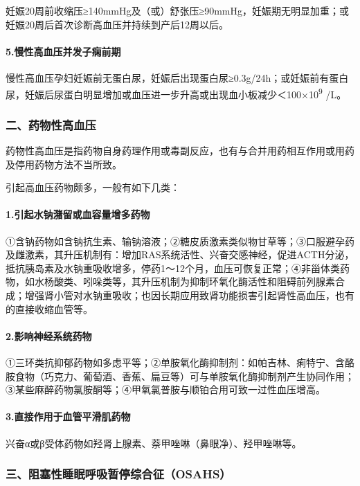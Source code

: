 妊娠20周前收缩压≥140mmHg及（或）舒张压≥90mmHg，妊娠期无明显加重；或妊娠20周后首次诊断高血压并持续到产后12周以后。

\paragraph{5.慢性高血压并发子痫前期}

慢性高血压孕妇妊娠前无蛋白尿，妊娠后出现蛋白尿≥0.3g/24h；或妊娠前有蛋白尿，妊娠后尿蛋白明显增加或血压进一步升高或出现血小板减少＜100×10\textsuperscript{9}
/L。

\subsubsection{二、药物性高血压}

药物性高血压是指药物自身药理作用或毒副反应，也有与合并用药相互作用或用药及停用药物方法不当所致。

引起高血压药物颇多，一般有如下几类：

\paragraph{1.引起水钠潴留或血容量增多药物}

①含钠药物如含钠抗生素、输钠溶液；②糖皮质激素类似物甘草等；③口服避孕药及雌激素，其升压机制有：增加RAS系统活性、兴奋交感神经，促进ACTH分泌，抵抗胰岛素及水钠重吸收增多，停药1～12个月，血压可恢复正常；④非甾体类药物，如水杨酸类、吲哚类等，其升压机制为抑制环氧化酶活性和阻碍前列腺素合成；增强肾小管对水钠重吸收；也因长期应用致肾功能损害引起肾性高血压，也有的直接收缩血管等。

\paragraph{2.影响神经系统药物}

①三环类抗抑郁药物如多虑平等；②单胺氧化酶抑制剂：如帕吉林、痢特宁、含酪胺食物（巧克力、葡萄酒、香蕉、扁豆等）可与单胺氧化酶抑制剂产生协同作用；③某些麻醉药物氯胺酮等；④甲氧氯普胺与顺铂合用可致一过性血压增高。

\paragraph{3.直接作用于血管平滑肌药物}

兴奋α或β受体药物如羟肾上腺素、萘甲唑啉（鼻眼净）、羟甲唑啉等。

\subsubsection{三、阻塞性睡眠呼吸暂停综合征（OSAHS）}

